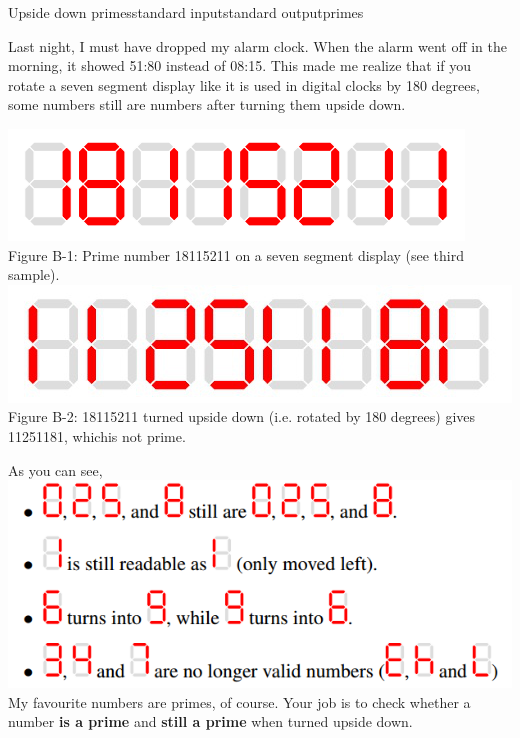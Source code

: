 \begin{problem}{Upside down primes}{standard input}{standard output}{primes}

Last night, I must have dropped my alarm clock. When the alarm went off in the morning, it showed
51:80 instead of 08:15. This made me realize that if you rotate a seven segment display like it is
used in digital clocks by 180 degrees, some numbers still are numbers after turning them upside
down.

\begin{center}
  \includegraphics[scale=0.5]{./texts/src/b1.png}\\
  Figure B-1: Prime number 18115211 on a seven segment display (see third sample).\\
  \includegraphics[scale=0.5]{./texts/src/b2.png}\\
  Figure B-2: 18115211 turned upside down (i.e. rotated by 180 degrees) gives 11251181, whichis not
              prime.
\end{center}

As you can see,\\
\includegraphics[scale=0.5]{./texts/src/b3.png}\\

My favourite numbers are primes, of course. Your job is to check whether a number
\textbf{is a prime} and \textbf{still a prime} when turned upside down.\\


\end{problem}
